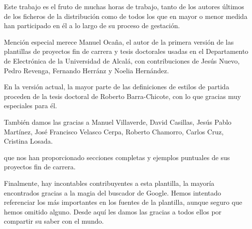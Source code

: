 \documentclass[spanish,openright]{book}
\begin{document}
Este trabajo es el fruto de muchas horas de trabajo, tanto de los
autores últimos de los ficheros de la distribución como de todos los que
en mayor o menor medida han participado en él a lo largo de su proceso
de gestación.

Mención especial merece Manuel Ocaña, el autor de la primera versión de
las plantillas de proyectos fin de carrera y tesis doctorales usadas en
el Departamento de Electrónica de la Universidad de Alcalá, con
contribuciones de Jesús Nuevo, Pedro Revenga, Fernando Herránz y Noelia
Hernández.

En la versión actual, la mayor parte de las definiciones de estilos de
partida proceden de la tesis doctoral de Roberto Barra-Chicote, con lo
que gracias muy especiales para él.

También damos las gracias a Manuel Villaverde, David Casillas, Jesús Pablo Martínez, José Francisco Velasco Cerpa, Roberto Chamorro, Carlos Cruz, Cristina Losada.

  que nos
han proporcionado secciones completas y ejemplos puntuales de sus
proyectos fin de carrera.

Finalmente, hay incontables contribuyentes a esta plantilla, la mayoría
encontrados gracias a la magia del buscador de Google. Hemos intentado
referenciar los más importantes en los fuentes de la plantilla, aunque
seguro que hemos omitido alguno. Desde aquí les damos las gracias a
todos ellos por compartir su saber con el mundo.







 






\end{document}
